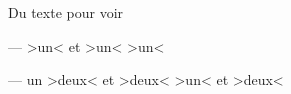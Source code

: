 \documentclass{scrartcl}
\newcommand*\mynew[2][\null]{%
\ifx#1\null%
>#2< et >#2<%
\else%
>#1< et >#2<%
\fi%
}
\begin{document}
Du texte pour voir

--- \mynew{un}

--- \mynew[un]{deux}
\end{document}
